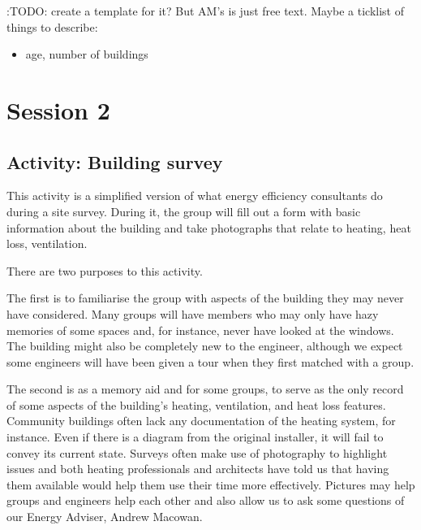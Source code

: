 \documentclass[letterpaper,10pt,english]{jupyterBook}
\begin{document}
\sphinxAtStartPar
:TODO: create a template for it?  But AM’s is just free text.  Maybe a ticklist of things to describe:
\begin{itemize}
\item {} 
\sphinxAtStartPar
age, number of buildings

\end{itemize}

\sphinxstepscope


\chapter{Session 2}
\label{\detokenize{session2/session2:session-2}}\label{\detokenize{session2/session2::doc}}
\sphinxstepscope


\section{Activity:  Building survey}
\label{\detokenize{session2/details/activity:activity-building-survey}}\label{\detokenize{session2/details/activity::doc}}
\sphinxAtStartPar
This activity is a simplified version of what energy efficiency consultants do during a site survey. During it, the group will fill out a form with basic information about the building and take photographs that relate to heating, heat loss, ventilation.

\sphinxAtStartPar
There are two purposes to this activity.

\sphinxAtStartPar
The first is to familiarise the group with aspects of the building they may never have considered.  Many groups will have members who may only have hazy memories of some spaces and, for instance, never have looked at the windows.  The building might also be completely new to the engineer, although we expect some engineers will have been given a tour when they first matched with a group.

\sphinxAtStartPar
The second is as a memory aid and for some groups, to serve as the only record of some aspects of the building’s heating, ventilation, and heat loss features.  Community buildings often lack any documentation of the heating system, for instance.  Even if there is a diagram from the original installer, it will fail to convey its current state.  Surveys often make use of photography to highlight issues and both heating professionals and architects have told us that having them available would help them use their time more effectively.  Pictures may help groups and engineers help each other and also allow us to ask some questions of our Energy Adviser, Andrew Macowan.
\end{document}
